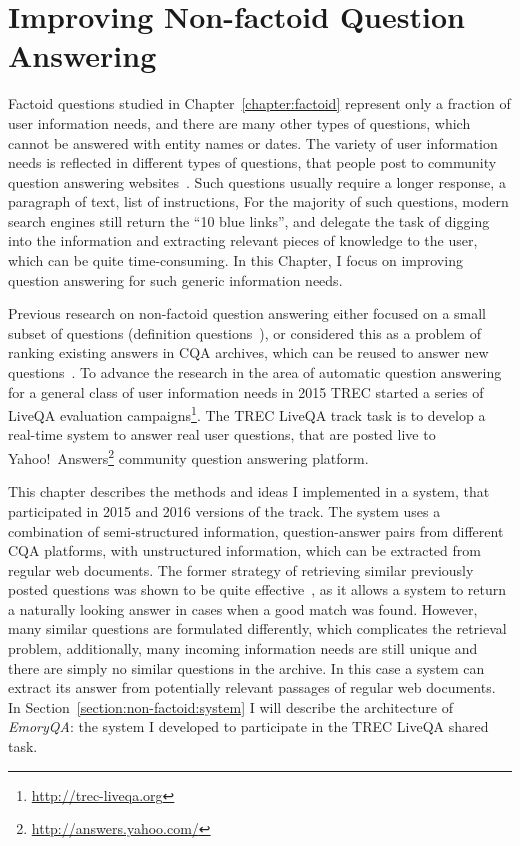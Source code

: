 \chapter{Improving Non-factoid Question Answering}
\label{chapter:non-factoid}

Factoid questions studied in Chapter~\ref{chapter:factoid} represent only a fraction of user information needs, and there are many other types of questions, which cannot be answered with entity names or dates.
The variety of user information needs is reflected in different types of questions, that people post to community question answering websites~\cite{harper2010question,ignatova2009annotating,Liu:2008:USA:1599081.1599144}.
Such questions usually require a longer response, \eg a paragraph of text, list of instructions, \etc
For the majority of such questions, modern search engines still return the ``10 blue links'', and delegate the task of digging into the information and extracting relevant pieces of knowledge to the user, which can be quite time-consuming.
In this Chapter, I focus on improving question answering for such generic information needs.

Previous research on non-factoid question answering either focused on a small subset of questions (\eg definition questions~\cite{hildebrandt2004answering}), or considered this as a problem of ranking existing answers in CQA archives, which can be reused to answer new questions~\cite{carmel2000eresponder,Shtok:2012:LPA:2187836.2187939}.
To advance the research in the area of automatic question answering for a general class of user information needs in 2015 TREC started a series of LiveQA evaluation campaigns\footnote{\href{url}{http://trec-liveqa.org}}.
The TREC LiveQA track task is to develop a real-time system to answer real user questions, that are posted live to Yahoo!~Answers\footnote{\href{url}{http://answers.yahoo.com/}} community question answering platform.

This chapter describes the methods and ideas I implemented in a system, that participated in 2015 and 2016 versions of the track.
The system uses a combination of semi-structured information, \ie question-answer pairs from different CQA platforms, with unstructured information, which can be extracted from regular web documents.
The former strategy of retrieving similar previously posted questions was shown to be quite effective~\cite{carmel2000eresponder,Shtok:2012:LPA:2187836.2187939}, as it allows a system to return a naturally looking answer in cases when a good match was found.
However, many similar questions are formulated differently, which complicates the retrieval problem, additionally, many incoming information needs are still unique and there are simply no similar questions in the archive.
In this case a system can extract its answer from potentially relevant passages of regular web documents.
In Section~\ref{section:non-factoid:system} I will describe the architecture of \textit{EmoryQA}: the system I developed to participate in the TREC LiveQA shared task.

